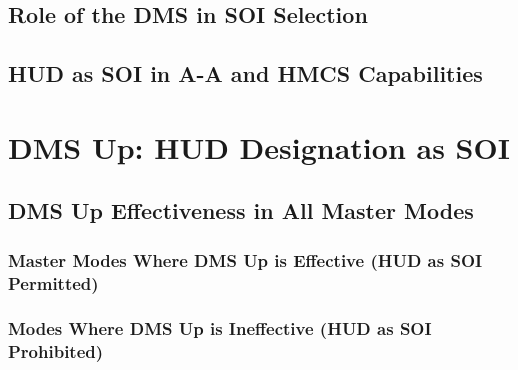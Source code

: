 \documentclass[11pt, a4paper, twoside]{report}
\begin{document}
\subsection{Role of the DMS in SOI Selection}
\label{sec:C4-S1-S2}

\subsection{HUD as SOI in A-A and HMCS Capabilities}
\label{sec:C4-S1-S3}

\section{DMS Up: HUD Designation as SOI}
\label{sec:C4-S2}

\subsection{DMS Up Effectiveness in All Master Modes}
\label{sec:C4-S2-S1}

\subsubsection{Master Modes Where DMS Up is Effective (HUD as SOI Permitted)}
\label{sec:C4-S2-S1-S1}

\subsubsection{Modes Where DMS Up is Ineffective (HUD as SOI Prohibited)}
\label{sec:C4-S2-S1-S2}
\end{document}
